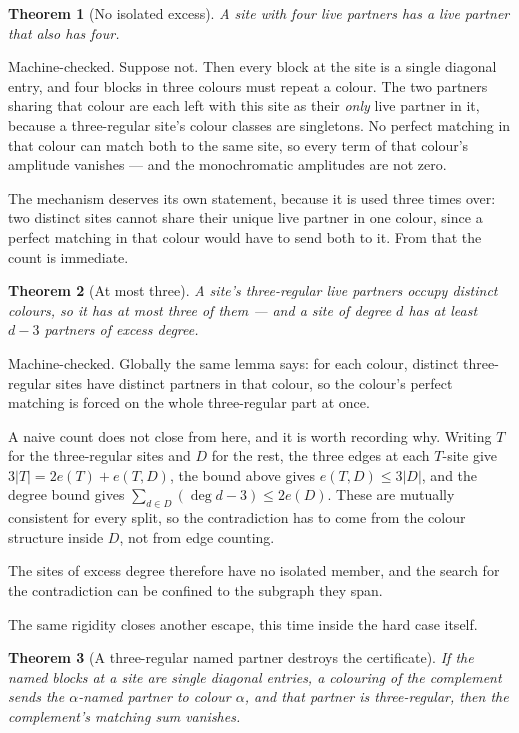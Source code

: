 \documentclass[11pt]{article}
\newtheorem{theorem}{Theorem}[section]
\theoremstyle{definition}
\theoremstyle{remark}
\begin{document}
\begin{theorem}[No isolated excess]\label{thm:noisolated}
A site with four live partners has a live partner that also has four.
\end{theorem}

Machine-checked. Suppose not. Then every block at the site is a single diagonal entry, and
four blocks in three colours must repeat a colour. The two partners sharing that colour are
each left with this site as their \emph{only} live partner in it, because a three-regular
site's colour classes are singletons. No perfect matching in that colour can match both to
the same site, so every term of that colour's amplitude vanishes --- and the monochromatic
amplitudes are not zero.

The mechanism deserves its own statement, because it is used three times over: two distinct
sites cannot share their unique live partner in one colour, since a perfect matching in that
colour would have to send both to it. From that the count is immediate.

\begin{theorem}[At most three]\label{thm:atmostthree}
A site's three-regular live partners occupy distinct colours, so it has at most three of them
--- and a site of degree $d$ has at least $d-3$ partners of excess degree.
\end{theorem}

Machine-checked. Globally the same lemma says: for each colour, distinct three-regular sites
have distinct partners in that colour, so the colour's perfect matching is forced on the whole
three-regular part at once.

A naive count does not close from here, and it is worth recording why. Writing $T$ for the
three-regular sites and $D$ for the rest, the three edges at each $T$-site give
$3|T| = 2e(T) + e(T,D)$, the bound above gives $e(T,D) \leq 3|D|$, and the degree bound gives
$\sum_{d \in D}(\deg d - 3) \leq 2e(D)$. These are mutually consistent for every split, so the
contradiction has to come from the colour structure inside $D$, not from edge counting.

The sites of excess degree therefore have no isolated member, and the search for the
contradiction can be confined to the subgraph they span.

The same rigidity closes another escape, this time inside the hard case itself.

\begin{theorem}[A three-regular named partner destroys the certificate]\label{thm:namedkill}
If the named blocks at a site are single diagonal entries, a colouring of the complement
sends the $\alpha$-named partner to colour $\alpha$, and that partner is three-regular, then
the complement's matching sum vanishes.
\end{theorem}
\end{document}
